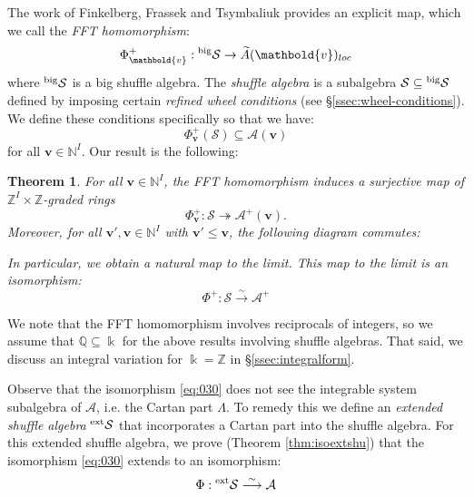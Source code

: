 \documentclass[11pt,reqno]{amsart}
\renewcommand{\mathbf}{\mathbold}
\numberwithin{equation}{section}
\newtheorem{Theorem}[equation]{Theorem}
\theoremstyle{definition}
\newcommand{\cA}{\mathcal{A}}
\newcommand{\cS}{\mathcal{S}}
\newcommand{\bv}{\mathbf{v}}
\newcommand{\NN}{\mathbb{N}}
\newcommand{\QQ}{\mathbb{Q}}
\newcommand{\ZZ}{\mathbb{Z}}
\renewcommand{\tilde}[1]{\widetilde{#1}}
\newcommand{\leftexp}[2]{\vphantom{#2}^{#1} #2}
\newcommand{\kk}{\Bbbk}
\renewcommand{\bv}{\mathbf{v}} %
\newcommand{\vertexset}{I}
\newcommand{\GT}{\Lambda}
\newcommand{\qzast}{\cA}
\newcommand{\qzastplus}{\cA^{+}}
\newcommand{\GKLO}[1]{\tilde{A}(#1)_{loc}}
\newcommand{\shu}{\cS}
\newcommand{\preshu}{\leftexp{\mathrm{big}}{\cS}}
\newcommand{\extshu}{\leftexp{\mathrm{ext}}{\cS}}
\begin{document}
The work of Finkelberg, Frassek and Tsymbaliuk \cite{FT2,Frassek-Tsymbaliuk-2022,Tsymbaliuk2} provides an explicit map, which we call the \emph{FFT homomorphism}:
\begin{equation}
  \label{eq:60}
 \Phi_{\bv}^+: \preshu \rightarrow \GKLO{\bv} 
\end{equation}
where $\preshu$ is a big shuffle algebra. The \emph{shuffle algebra} is a subalgebra $\shu \subseteq \preshu$ defined by imposing certain \emph{refined wheel conditions} (see \S \ref{ssec:wheel-conditions}). We define these conditions specifically so that  we have:
\begin{equation}
  \label{eq:63}
 \Phi_{\bv}^+(\shu) \subseteq \qzast(\bv)
\end{equation}
for all $\bv \in \NN^\vertexset$. Our result is the following:
\begin{Theorem}
For all $\bv \in \NN^I$, the FFT homomorphism induces a surjective map of $\ZZ^\vertexset \times \ZZ$-graded rings
  \begin{equation}
    \label{eq:11}
   \Phi^+_\bv: \shu \twoheadrightarrow \qzastplus(\bv).
  \end{equation}
 Moreover, for all $\bv', \bv \in \NN^I$ with $\bv' \leq \bv$, the following diagram commutes: 
\begin{center}
\end{center}
In particular, we obtain a natural map to the limit. This map to the limit is an isomorphism:
\begin{equation}
  \label{eq:030}
  \Phi^+ : \cS \overset{\sim}{\longrightarrow} \qzastplus 
\end{equation}
\end{Theorem}
We note that the FFT homomorphism involves reciprocals of integers, so we assume that $\QQ \subseteq \kk$ for the above results involving shuffle algebras. That said, we discuss an integral variation for $\kk = \ZZ$ in \S \ref{ssec:integralform}.

Observe that the isomorphism \eqref{eq:030} does not see the integrable system subalgebra of $\cA$, i.e. the Cartan part $\GT$. To remedy this we define an \emph{extended shuffle algebra} $\extshu$ that incorporates a Cartan part into the shuffle algebra. For this extended shuffle algebra, we prove (Theorem \ref{thm:isoextshu}) that the isomorphism \eqref{eq:030} extends to an isomorphism:
\begin{equation}
  \label{eq:64}
\Phi: \extshu \overset{\sim}{\longrightarrow} \qzast
\end{equation}
\end{document}
